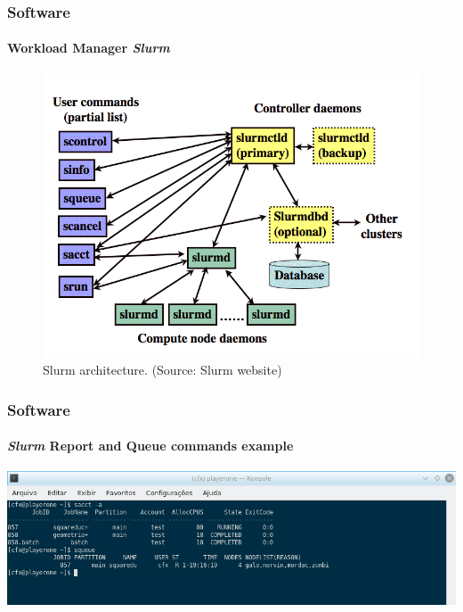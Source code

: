 \documentclass[svgnames,smaller,table]{beamer}
\begin{document}
\begin{frame}
  \frametitle{Software}
  \framesubtitle{Workload Manager \textit{Slurm}}
  \begin{figure}
  \centering\includegraphics[scale=0.35]{images/slurm-arch.png}
  \caption{Slurm architecture. (Source: Slurm website)}
  \end{figure}
\end{frame}

\begin{frame}
  \frametitle{Software}
  \framesubtitle{\textit{Slurm} Report and Queue commands example}
  \centering\includegraphics[scale=0.45]{images/Screenshot_20190719_152935.png}
\end{frame}
\end{document}
